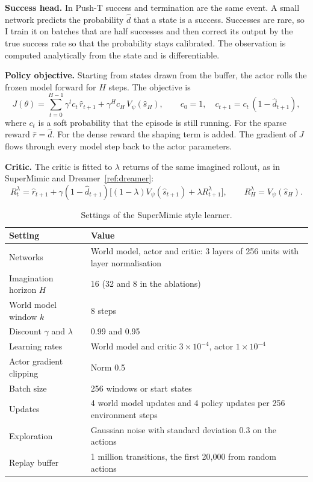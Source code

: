 \documentclass[11pt,a4paper]{article}
\newcommand{\thd}[1]{\textbf{\color{Ink}#1}}
\renewcommand{\cite}[1]{\ref{ref:#1}}
\begin{document}
\textbf{Success head.} In Push-T success and termination are the same event. A small network
predicts the probability $\hat d$ that a state is a success. Successes are rare, so I train it on
batches that are half successes and then correct its output by the true success rate so that the
probability stays calibrated. The observation is computed analytically from the state and is
differentiable.

\textbf{Policy objective.} Starting from states drawn from the buffer, the actor rolls the frozen
model forward for $H$ steps. The objective is
\begin{equation}
  J(\theta) = \sum_{t=0}^{H-1} \gamma^t c_t\, \hat r_{t+1} + \gamma^H c_H\, V_\psi(\hat s_H),
  \qquad c_0 = 1,\quad c_{t+1} = c_t\,(1-\hat d_{t+1}),
\end{equation}
where $c_t$ is a soft probability that the episode is still running. For the sparse reward
$\hat r = \hat d$. For the dense reward the shaping term is added. The gradient of $J$ flows through
every model step back to the actor parameters.

\textbf{Critic.} The critic is fitted to $\lambda$ returns of the same imagined rollout, as in
SuperMimic and Dreamer~\cite{dreamer}:
\begin{equation}
  R_t^\lambda = \hat r_{t+1} + \gamma(1-\hat d_{t+1})\big[(1-\lambda)V_\psi(\hat s_{t+1}) + \lambda R_{t+1}^\lambda\big],
  \qquad R_H^\lambda = V_\psi(\hat s_H).
\end{equation}

\begin{table}[htbp]
\centering
\small
\caption{Settings of the SuperMimic style learner.}
\label{tab:sm}
\begin{tabularx}{\textwidth}{|p{5.2cm}|L|}
\hline
{}
\thd{Setting} & \thd{Value} \\
\hline
Networks & World model, actor and critic: 3 layers of 256 units with layer normalisation \\
\hline
Imagination horizon $H$ & 16 (32 and 8 in the ablations) \\
\hline
World model window $k$ & 8 steps \\
\hline
Discount $\gamma$ and $\lambda$ & 0.99 and 0.95 \\
\hline
Learning rates & World model and critic $3\times10^{-4}$, actor $1\times10^{-4}$ \\
\hline
Actor gradient clipping & Norm 0.5 \\
\hline
Batch size & 256 windows or start states \\
\hline
Updates & 4 world model updates and 4 policy updates per 256 environment steps \\
\hline
Exploration & Gaussian noise with standard deviation 0.3 on the actions \\
\hline
Replay buffer & 1 million transitions, the first 20{,}000 from random actions \\
\hline
\end{tabularx}
\end{table}
\end{document}
